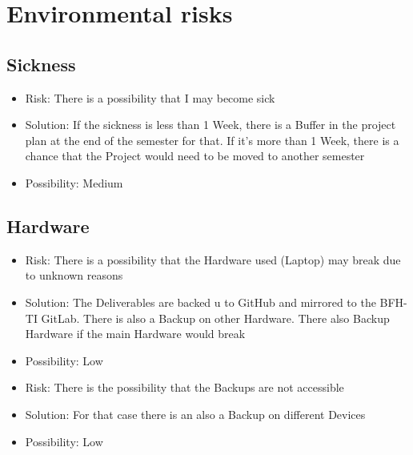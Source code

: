 \documentclass[
	a4paper               %
	,bibliography=totoc   %
	,listof=totoc         %
	,monolingual
	twoside=false,
]{bfhthesis}              %
\begin{document}
\section{Environmental risks}

\subsection{Sickness}
\begin{itemize}
	\item Risk: There is a possibility that I may become sick
	\item Solution: If the sickness is less than 1 Week, there is a Buffer in the project plan at the end of the semester for that. If it's more than 1 Week, there is a chance that the Project would need to be moved to another semester
	\item Possibility: Medium
\end{itemize}

\subsection{Hardware}
\begin{itemize}
	\item Risk: There is a possibility that the Hardware used (Laptop) may break due to unknown reasons
	\item Solution: The Deliverables are backed u to GitHub and mirrored to the BFH-TI GitLab. There is also a Backup on other Hardware. There also Backup Hardware if the main Hardware would break
	\item Possibility: Low
\end{itemize}
\begin{itemize}
	\item Risk: There is the possibility that the Backups are not accessible
	\item Solution: For that case there is an also a Backup on different Devices
	\item Possibility: Low
\end{itemize}
\end{document}
